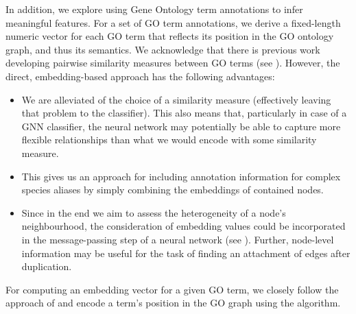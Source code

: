 \documentclass[
	fontsize=10pt, %
	twoside=false, %
	secnumdepth=1, %
  toc=indentunnumbered %
]{kaobook}
\begin{document}
In addition, we explore using Gene Ontology term annotations to infer meaningful
features.
%
For a set of GO term annotations, we derive a fixed-length numeric
 vector for each GO term that reflects its position in the GO
ontology graph, and thus its semantics. We acknowledge that there is previous
work developing pairwise similarity measures between GO terms (see
). However, the direct, embedding-based approach has
the following advantages:
%
\begin{itemize}
\item We are alleviated of the choice of a similarity measure
  (effectively leaving that problem to the classifier). This also means that,
  particularly in case of a GNN classifier, the neural network may potentially
  be able to capture more flexible relationships than what we would encode with
  some similarity measure.
\item This gives us an approach for including annotation information for
  complex species aliases by simply combining the embeddings of contained nodes.
\item Since in the end we aim to assess the heterogeneity of a node's
  neighbourhood, the consideration of embedding values could be incorporated in
  the message-passing step of a neural network (see ). Further,
  node-level information may be useful for the task of finding an attachment of
  edges after duplication.
\end{itemize}

For computing an embedding vector for a given GO term, we closely follow the
approach of \citeauthor{zhong_GO2VecTransformingGO_2020}
\cite{zhong_GO2VecTransformingGO_2020} and encode a term's position in the GO
graph using the  algorithm.
\end{document}
